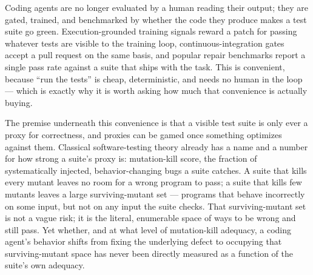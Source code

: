 \documentclass[11pt]{article}
\begin{document}
Coding agents are no longer evaluated by a human reading their output; they are gated, trained, and benchmarked by whether the code they produce makes a test suite go green. Execution-grounded training signals reward a patch for passing whatever tests are visible to the training loop, continuous-integration gates accept a pull request on the same basis, and popular repair benchmarks report a single pass rate against a suite that ships with the task. This is convenient, because ``run the tests'' is cheap, deterministic, and needs no human in the loop --- which is exactly why it is worth asking how much that convenience is actually buying.

The premise underneath this convenience is that a visible test suite is only ever a proxy for correctness, and proxies can be gamed once something optimizes against them. Classical software-testing theory already has a name and a number for how strong a suite's proxy is: mutation-kill score, the fraction of systematically injected, behavior-changing bugs a suite catches. A suite that kills every mutant leaves no room for a wrong program to pass; a suite that kills few mutants leaves a large surviving-mutant set --- programs that behave incorrectly on some input, but not on any input the suite checks. That surviving-mutant set is not a vague risk; it is the literal, enumerable space of ways to be wrong and still pass. Yet whether, and at what level of mutation-kill adequacy, a coding agent's behavior shifts from fixing the underlying defect to occupying that surviving-mutant space has never been directly measured as a function of the suite's own adequacy.
\end{document}
